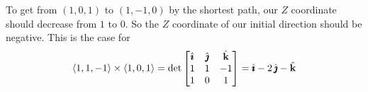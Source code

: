 \begin{solution}
To get from $(1,0,1)$ to $(1,-1,0)$ by the shortest path, our $Z$ 
coordinate should decrease from $1$ to $0$. So the $Z$ coordinate of 
our initial direction should be negative. This is the case for 
\begin{equation*}
\left< 1,1,-1\right>\times\left< 1,0,1\right>
=\det\left[\begin{matrix}
                     \hat{\pmb{\imath}} & \hat{\pmb{\jmath}} & \hat{\mathbf{k}} \\
                     1   &  1  & -1 \\
                     1   &  0  &  1
                \end{matrix}\right]
=\hat{\pmb{\imath}} - 2\,\hat{\pmb{\jmath}} -\hat{\mathbf{k}}
\end{equation*}
\end{solution}

